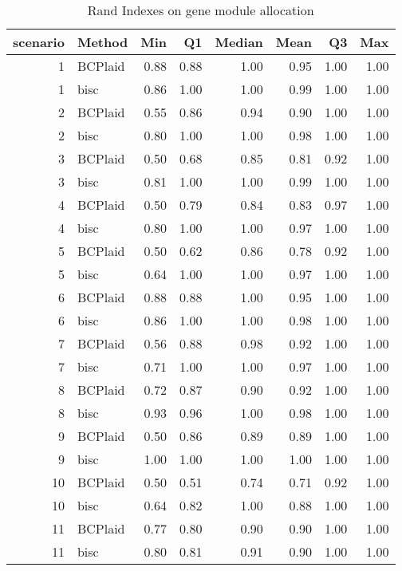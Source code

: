 \begin{table}[ht]
\caption{Rand Indexes on gene module allocation}
\vspace{1.5cm}
\centering
\begin{tabular}{rlrrrrrr}
  \toprule
scenario & Method & Min & Q1 & Median & Mean & Q3 & Max \\ 
  \midrule
  1 & BCPlaid & 0.88 & 0.88 & 1.00 & 0.95 & 1.00 & 1.00 \\ 
    1 & bisc & 0.86 & 1.00 & 1.00 & 0.99 & 1.00 & 1.00 \\ 
    2 & BCPlaid & 0.55 & 0.86 & 0.94 & 0.90 & 1.00 & 1.00 \\ 
    2 & bisc & 0.80 & 1.00 & 1.00 & 0.98 & 1.00 & 1.00 \\ 
    3 & BCPlaid & 0.50 & 0.68 & 0.85 & 0.81 & 0.92 & 1.00 \\ 
    3 & bisc & 0.81 & 1.00 & 1.00 & 0.99 & 1.00 & 1.00 \\ 
    4 & BCPlaid & 0.50 & 0.79 & 0.84 & 0.83 & 0.97 & 1.00 \\ 
    4 & bisc & 0.80 & 1.00 & 1.00 & 0.97 & 1.00 & 1.00 \\ 
    5 & BCPlaid & 0.50 & 0.62 & 0.86 & 0.78 & 0.92 & 1.00 \\ 
    5 & bisc & 0.64 & 1.00 & 1.00 & 0.97 & 1.00 & 1.00 \\ 
    6 & BCPlaid & 0.88 & 0.88 & 1.00 & 0.95 & 1.00 & 1.00 \\ 
    6 & bisc & 0.86 & 1.00 & 1.00 & 0.98 & 1.00 & 1.00 \\ 
    7 & BCPlaid & 0.56 & 0.88 & 0.98 & 0.92 & 1.00 & 1.00 \\ 
    7 & bisc & 0.71 & 1.00 & 1.00 & 0.97 & 1.00 & 1.00 \\ 
    8 & BCPlaid & 0.72 & 0.87 & 0.90 & 0.92 & 1.00 & 1.00 \\ 
    8 & bisc & 0.93 & 0.96 & 1.00 & 0.98 & 1.00 & 1.00 \\ 
    9 & BCPlaid & 0.50 & 0.86 & 0.89 & 0.89 & 1.00 & 1.00 \\ 
    9 & bisc & 1.00 & 1.00 & 1.00 & 1.00 & 1.00 & 1.00 \\ 
   10 & BCPlaid & 0.50 & 0.51 & 0.74 & 0.71 & 0.92 & 1.00 \\ 
   10 & bisc & 0.64 & 0.82 & 1.00 & 0.88 & 1.00 & 1.00 \\ 
   11 & BCPlaid & 0.77 & 0.80 & 0.90 & 0.90 & 1.00 & 1.00 \\ 
   11 & bisc & 0.80 & 0.81 & 0.91 & 0.90 & 1.00 & 1.00 \\ 

\end{tabular}
\end{table}
